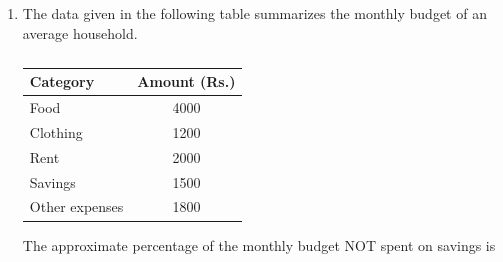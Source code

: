 \documentclass[journal,12pt,onecolumn]{IEEEtran}
\theoremstyle{remark}
\begin{document}
\begin{enumerate}[start=1, label=Q.\arabic*]
\begin{enumerate}
\end{enumerate}
\hfill{}

\item The data given in the following table summarizes the monthly budget of an average household.
\begin{table}[H]
\centering
\begin{tabular}{|l|c|}
\hline
\textbf{Category} & \textbf{Amount (Rs.)} \\
\hline
Food & 4000 \\
Clothing & 1200 \\
Rent & 2000 \\
Savings & 1500 \\
Other expenses & 1800 \\
\hline
\end{tabular}
\caption*{}
\label{tab:budget}
\end{table}
The approximate percentage of the monthly budget NOT spent on savings is

\begin{enumerate}
\end{enumerate}
\hfill{}

\end{enumerate}
\end{document}
